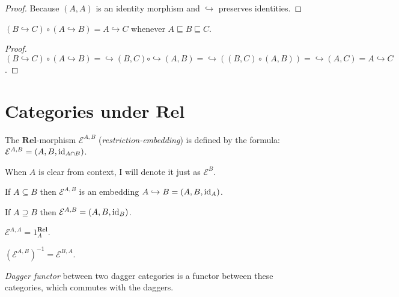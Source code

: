 \begin{proof}
  Because $(A , A)$ is an identity morphism and $\hookrightarrow$ preserves
  identities.
\end{proof}

\begin{prop}
  $(B \hookrightarrow C) \circ (A \hookrightarrow B) = A \hookrightarrow C$
  whenever $A \sqsubseteq B \sqsubseteq C$.
\end{prop}

\begin{proof}
  $(B \hookrightarrow C) \circ (A \hookrightarrow B) = \hookrightarrow (B , C)
  \circ \hookrightarrow (A , B) = \hookrightarrow ((B , C) \circ (A , B)) =
  \hookrightarrow (A , C) = A \hookrightarrow C$.
\end{proof}

\section{\texorpdfstring{Categories under $\mathbf{Rel}$}{Categories under Rel}}

\begin{defn}
  The $\mathbf{Rel}$-morphism $\mathcal{E}^{A,B}$
  (\emph{restriction-embedding}) is defined by the formula: $\mathcal{E}^{A,B}
  = (A , B , \operatorname{id}_{A \cap B})$.
  
  When $A$ is clear from context, I will denote it just as $\mathcal{E}^B$.
\end{defn}

\begin{obvious}
If $A \subseteq B$ then $\mathcal{E}^{A,B}$ is an embedding $A \hookrightarrow B
= (A , B , \operatorname{id}_A)$.
\end{obvious}

\begin{obvious}
If $A \supseteq B$ then $\mathcal{E}^{A,B} = (A , B ,
\operatorname{id}_B)$.
\end{obvious}

\begin{obvious}
$\mathcal{E}^{A,A} = 1^{\mathbf{Rel}}_A$.
\end{obvious}

\begin{obvious}
$(\mathcal{E}^{A,B})^{- 1} = \mathcal{E}^{B,A}$.
\end{obvious}

\begin{defn}
\emph{Dagger functor} between two dagger categories is a functor between
these categories, which commutes with the daggers.
\end{defn}

